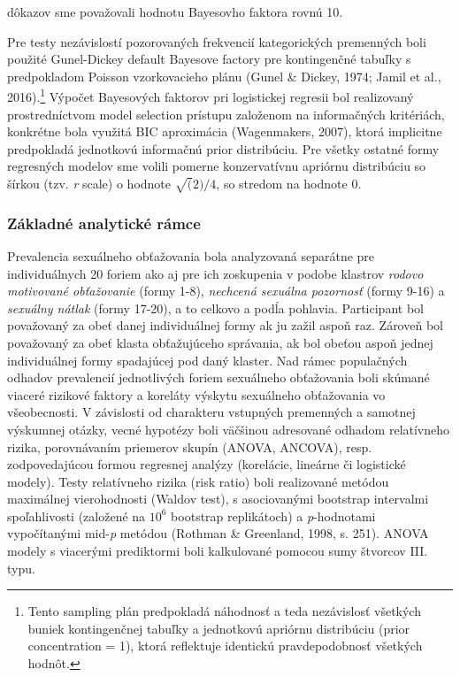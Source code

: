 \documentclass[
]{article}
\begin{document}
dôkazov sme považovali hodnotu Bayesovho faktora rovnú 10.

Pre testy nezávislostí pozorovaných frekvencií kategorických premenných boli použité Gunel-Dickey default Bayesove factory pre kontingenčné tabuľky s predpokladom Poisson vzorkovacieho plánu (Gunel \& Dickey, 1974; Jamil et al., 2016).\footnote{Tento sampling plán predpokladá náhodnosť a teda nezávislosť všetkých buniek kontingenčnej tabuľky a jednotkovú apriórnu distribúciu (prior concentration = 1), ktorá reflektuje identickú pravdepodobnosť všetkých hodnôt.} Výpočet Bayesových faktorov pri logistickej regresii bol realizovaný prostredníctvom model selection prístupu založenom na informačných kritériách, konkrétne bola využitá BIC aproximácia (Wagenmakers, 2007), ktorá implicitne predpokladá jednotkovú informačnú prior distribúciu. Pre všetky ostatné formy regresných modelov sme volili pomerne konzervatívnu apriórnu distribúciu so šírkou (tzv. \emph{r} scale) o hodnote \(\sqrt(2)/4\), so stredom na hodnote 0.

\hypertarget{zuxe1kladnuxe9-analytickuxe9-ruxe1mce}{%
\subsubsection{Základné analytické rámce}\label{zuxe1kladnuxe9-analytickuxe9-ruxe1mce}}

Prevalencia sexuálneho obťažovania bola analyzovaná separátne pre individuálnych 20 foriem ako aj pre ich zoskupenia v podobe klastrov \emph{rodovo motivované obťažovanie} (formy 1-8), \emph{nechcená sexuálna pozornosť} (formy 9-16) a \emph{sexuálny nátlak} (formy 17-20), a to celkovo a podĺa pohlavia. Participant bol považovaný za obeť danej individuálnej formy ak ju zažil aspoň raz. Zároveň bol považovaný za obeť klasta obťažujúceho správania, ak bol obeťou aspoň jednej individuálnej formy spadajúcej pod daný klaster. Nad rámec populačných odhadov prevalencií jednotlivých foriem sexuálneho obťažovania boli skúmané viaceré rizikové faktory a koreláty výskytu sexuálneho obťažovania vo všeobecnosti. V závislosti od charakteru vstupných premenných a samotnej výskumnej otázky, vecné hypotézy boli väčšinou adresované odhadom relatívneho rizika, porovnávaním priemerov skupín (ANOVA, ANCOVA), resp. zodpovedajúcou formou regresnej analýzy (korelácie, lineárne či logistické modely). Testy relatívneho rizika (risk ratio) boli realizované metódou maximálnej vierohodnosti (Waldov test), s asociovanými bootstrap intervalmi spoľahlivosti (založené na \(10^6\) bootstrap replikátoch) a \emph{p}-hodnotami vypočítanými mid-\emph{p} metódou (Rothman \& Greenland, 1998, s. 251). ANOVA modely s viacerými prediktormi boli kalkulované pomocou sumy štvorcov III. typu.
\end{document}
